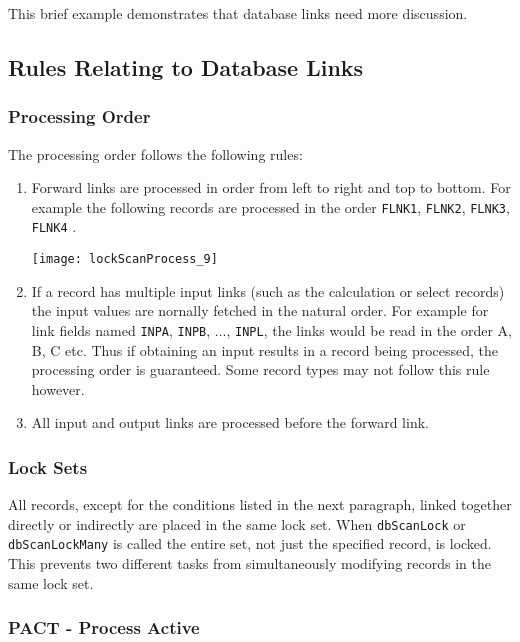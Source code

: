 This brief example demonstrates that database links need more discussion.

\subsection{Rules Relating to Database Links}

\subsubsection{Processing Order}

The processing order follows the following rules:

\begin{enumerate}
\item Forward links are processed in order from left to right and top to bottom. For example the following records are 
processed in the order \verb|FLNK1|, \verb|FLNK2|, \verb|FLNK3|, \verb|FLNK4| .

\begin{center}
\texttt{[image: lockScanProcess\_9]}
\end{center}

\item If a record has multiple input links (such as the calculation or select records) the input values are nornally fetched in the natural order.
For example for link fields named \verb|INPA|, \verb|INPB|, ..., \verb|INPL|, the links would be read in the order A, B, C etc.
Thus if obtaining an input results in a record being processed, the processing order is guaranteed.
Some record types may not follow this rule however.

\item All input and output links are processed before the forward link.

\end{enumerate}

\subsubsection{Lock Sets}

All records, except for the conditions listed in the next paragraph, linked together directly or indirectly are placed in the 
same lock set.
When \verb|dbScanLock| or \verb|dbScanLockMany| is called the entire set, not just the specified record, is locked.
This prevents two different tasks from simultaneously modifying records in the same lock set.

\subsubsection{PACT - Process Active}

